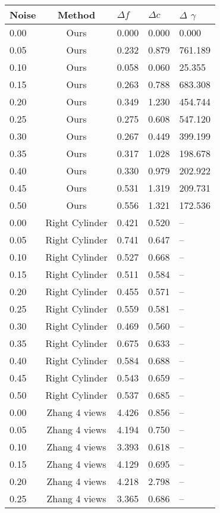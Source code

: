 \begin{table}[H]
\centering
\begin{tabular}{l c l l l}
\toprule
Noise & Method & $\Delta f$ & $\Delta c$ & $\Delta$ $\gamma$ \\
\midrule
0.00 & Ours & 0.000 & 0.000 & 0.000 \\
0.05 & Ours & 0.232 & 0.879 & 761.189 \\
0.10 & Ours & 0.058 & 0.060 & 25.355 \\
0.15 & Ours & 0.263 & 0.788 & 683.308 \\
0.20 & Ours & 0.349 & 1.230 & 454.744 \\
0.25 & Ours & 0.275 & 0.608 & 547.120 \\
0.30 & Ours & 0.267 & 0.449 & 399.199 \\
0.35 & Ours & 0.317 & 1.028 & 198.678 \\
0.40 & Ours & 0.330 & 0.979 & 202.922 \\
0.45 & Ours & 0.531 & 1.319 & 209.731 \\
0.50 & Ours & 0.556 & 1.321 & 172.536 \\
\midrule
\midrule
0.00 & Right Cylinder & 0.421 & 0.520 & -- \\
0.05 & Right Cylinder & 0.741 & 0.647 & -- \\
0.10 & Right Cylinder & 0.527 & 0.668 & -- \\
0.15 & Right Cylinder & 0.511 & 0.584 & -- \\
0.20 & Right Cylinder & 0.455 & 0.571 & -- \\
0.25 & Right Cylinder & 0.559 & 0.581 & -- \\
0.30 & Right Cylinder & 0.469 & 0.560 & -- \\
0.35 & Right Cylinder & 0.675 & 0.633 & -- \\
0.40 & Right Cylinder & 0.584 & 0.688 & -- \\
0.45 & Right Cylinder & 0.543 & 0.659 & -- \\
0.50 & Right Cylinder & 0.537 & 0.685 & -- \\
\midrule
0.00 & Zhang 4 views & 4.426 & 0.856 & -- \\
0.05 & Zhang 4 views & 4.194 & 0.750 & -- \\
0.10 & Zhang 4 views & 3.393 & 0.618 & -- \\
0.15 & Zhang 4 views & 4.129 & 0.695 & -- \\
0.20 & Zhang 4 views & 4.218 & 2.798 & -- \\
0.25 & Zhang 4 views & 3.365 & 0.686 & -- \\

\end{tabular}
\end{table}

